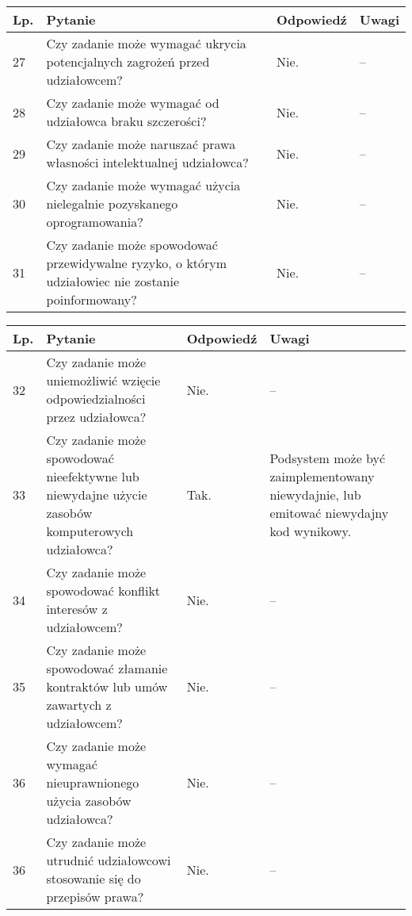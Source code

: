 \documentclass[11pt,oneside,a4paper,titlepage,onecolumn]{article}
\begin{document}
\begin{tabularx}{\textwidth}{|l|X|l|X|}
    \hline
    Lp. & Pytanie & Odpowiedź & Uwagi \\ \hline

	27
	& Czy zadanie może wymagać ukrycia potencjalnych zagrożeń przed udziałowcem?
	& Nie.
	& --
	\\\hline

	28
	& Czy zadanie może wymagać od udziałowca braku szczerości?
	& Nie.
	& --
	\\\hline

	29
	& Czy zadanie może naruszać prawa własności intelektualnej udziałowca?
	& Nie.
	& --
	\\\hline

	30
	& Czy zadanie może wymagać użycia nielegalnie pozyskanego oprogramowania?
	& Nie.
	& --
	\\\hline

	31
	& Czy zadanie może spowodować przewidywalne ryzyko, o którym udziałowiec nie
    zostanie poinformowany?
	& Nie.
	& --
	\\\hline
\end{tabularx}
	
\begin{tabularx}{\textwidth}{|l|X|l|X|}
    \hline
    Lp. & Pytanie & Odpowiedź & Uwagi \\ \hline
    
	32
	& Czy zadanie może uniemożliwić wzięcie odpowiedzialności przez udziałowca?
	& Nie.
	& --
	\\\hline

	33
	& Czy zadanie może spowodować nieefektywne lub niewydajne użycie zasobów
    komputerowych udziałowca?
	& Tak.
	& Podsystem może być zaimplementowany niewydajnie, lub emitować niewydajny
    kod wynikowy.
	\\\hline

	34
	& Czy zadanie może spowodować konflikt interesów z udziałowcem?
	& Nie.
	& --
	\\\hline

	35
	& Czy zadanie może spowodować złamanie kontraktów lub umów zawartych z
    udziałowcem?
	& Nie.
	& --
	\\\hline

	36
	& Czy zadanie może wymagać nieuprawnionego użycia zasobów udziałowca?
	& Nie.
	& --
	\\\hline

	36
	& Czy zadanie może utrudnić udziałowcowi stosowanie się do przepisów prawa?
	& Nie.
	& --
	\\\hline
\end{tabularx}
	
\end{document}
